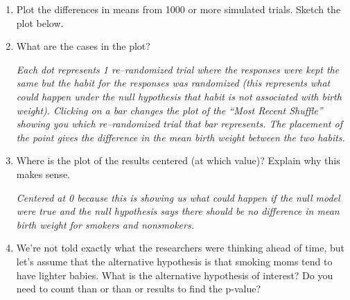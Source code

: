 \begin{enumerate}
           

{\bf Evaluate the Results }

\item  Plot the differences in means from  1000 or more simulated
  trials. Sketch the plot below.
\begin{students}
 \vspace{4cm}
\end{students}

\begin{key}
  {\it }
\end{key}



\item  What are the cases in the plot? %
\begin{students}
 \vspace{1cm}
\end{students}

\begin{key}
  {\it Each dot represents 1 re--randomized trial where the responses
   were kept the same but the habit for the responses
   was randomized (this represents what could happen under the null
   hypothesis that habit is not associated with
   birth weight).  Clicking on a bar changes the
   plot of the “Most Recent Shuffle” showing you which
   re--randomized trial that bar represents.  The placement
   of the point gives the difference in the mean birth
   weight between the two habits. }
\end{key}

   
\item  Where is the plot of the results centered (at which value)?
  Explain why this makes sense.
\begin{students}
 \vspace{3cm}
\end{students}

\begin{key}
  {\it  Centered at 0 because this is showing us what could happen if the
  null model were true and the null hypothesis says there should be
  no difference in mean birth weight for smokers and nonsmokers. }
\end{key}


\item  We're not told exactly what the researchers were thinking ahead
  of time, but let's assume that the alternative hypothesis is that
  smoking moms tend to have lighter babies.   What is the alternative
  hypothesis of interest? Do you need to count  than or
    than or  results to find the p-value? 
 

\end{enumerate}
